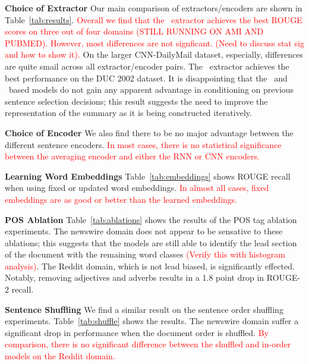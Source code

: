 

\textbf{Choice of Extractor} Our main comparison of extractors/encoders are shown in 
Table~\ref{tab:results}.
\textcolor{red}{Overall we find that the \modelTwoBF~extractor achieves the 
best ROUGE scores on three out of four domains (STILL RUNNING ON AMI AND PUBMED). 
However, most
differences are not signficant. (Need to discuss stat sig and how to show it).}
On the larger CNN-DailyMail dataset, especially, 
differences are quite smail across all extractor/encoder pairs.
The \baselineOneBF~extractor achieves the best performance on the DUC 2002
dataset. It is disappointing that the \baselineOneBF~and \baselineTwoBF~based 
models do not gain any apparent advantage in conditioning on previous 
sentence selection decisions; this result suggests the need to improve
the representation of the summary as it is being constructed iteratively.

\textbf{Choice of Encoder} We also find there to be no major advantage 
between the different sentence encoders. \textcolor{red}{In most cases,
there is no statistical significance between the averaging encoder and either
the RNN or CNN encoders.} 


\textbf{Learning Word Embeddings} Table~\ref{tab:embeddings} shows ROUGE recall
when using fixed or updated word embeddings. \textcolor{red}{In almost all
cases, fixed embeddings are as good or better than the learned embeddings.}



\textbf{POS Ablation} Table~\ref{tab:ablations} shows the results of the POS
tag ablation experiments. The newswire domain does not appear to be sensative
to these ablations; this suggests that the models are still able to identify
the lead section of the document with the remaining word classes \textcolor{red}{(Verify this with histogram analysis)}. 
The Reddit domain, which is not lead biased, is significantly effected.
Notably, removing adjectives and adverbs results in a 1.8 point drop 
in ROUGE-2 recall. 


\textbf{Sentence Shuffling} We find a similar result on the sentence order
shuffling experiments. Table~\ref{tab:shuffle} shows the results. 
The newswire domain suffer a significant drop in performance 
when the document order is shuffled. \textcolor{red}{By comparison, there is no significant difference between the shuffled and in-order models on 
the Reddit domain.} 



